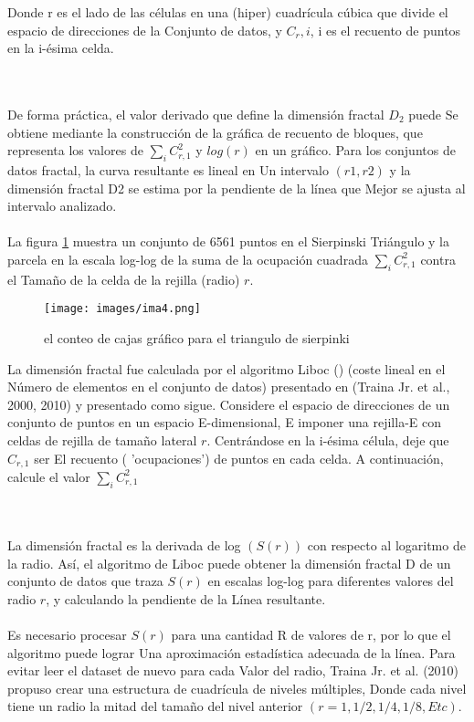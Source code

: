 Donde r es el lado de las células en una (hiper) cuadrícula cúbica que divide el espacio de direcciones de la
Conjunto de datos, y $C_r,i$, i es el recuento de puntos en la i-ésima celda.

\\\\
De forma práctica, el valor derivado que define la dimensión fractal $D_2$ puede
Se obtiene mediante la construcción de la gráfica de recuento de bloques, que representa los valores de
$\sum_i C_{r,1}^2$  y $log (r)$ en un gráfico. Para los conjuntos de datos fractal, la curva resultante es lineal en
Un intervalo $(r1, r2)$ y la dimensión fractal D2 se estima por la pendiente de la línea que
Mejor se ajusta al intervalo analizado.
\\\\
La figura \ref{fig:ima4} muestra un conjunto de 6561 puntos en el Sierpinski
Triángulo y la parcela en la escala log-log de la suma de la ocupación cuadrada $\sum_i C_{r,1}^2$ contra el
Tamaño de la celda de la rejilla (radio) $r$.

\begin{figure}[h]
\centering
\texttt{[image: images/ima4.png]}
\caption{el conteo de cajas gráfico para el triangulo de sierpinki}
\label{fig:ima4}
\end{figure}

La dimensión fractal fue calculada por el algoritmo Liboc () (coste lineal en el
Número de elementos en el conjunto de datos) presentado en (Traina Jr. et al., 2000, 2010) y presentado como sigue. Considere el espacio de direcciones de un conjunto de puntos en un espacio E-dimensional,
E imponer una rejilla-E con celdas de rejilla de tamaño lateral $r$. Centrándose en la i-ésima célula, deje que $ C_{r,1}$ ser
El recuento ( 'ocupaciones') de puntos en cada celda. A continuación, calcule el valor $\sum_i C_{r,1}^2$

\\\\

La dimensión fractal es la derivada de log $(S (r))$ con respecto al logaritmo de la
radio. Así, el algoritmo de Liboc puede obtener la dimensión fractal D de un conjunto de datos que traza
$S(r)$ en escalas log-log para diferentes valores del radio $r$, y calculando la pendiente de la
Línea resultante.
\\\\

Es necesario procesar $S(r)$ para una cantidad R de valores de r, por lo que el algoritmo puede lograr
Una aproximación estadística adecuada de la línea. Para evitar leer el dataset de nuevo para cada
Valor del radio, Traina Jr. et al. (2010) propuso crear una estructura de cuadrícula de niveles múltiples,
Donde cada nivel tiene un radio la mitad del tamaño del nivel anterior $(r = 1, 1/2, 1/4, 1/8, Etc). $
\\\\

